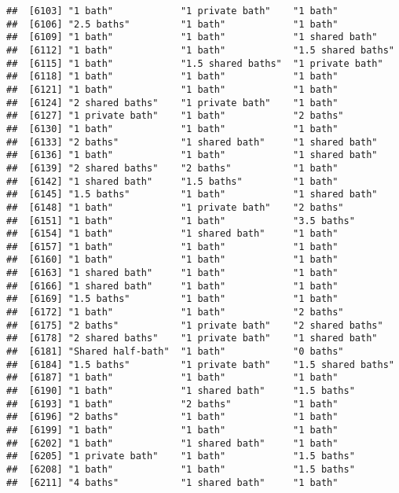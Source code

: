 \documentclass[
]{article}
\begin{document}
\begin{verbatim}
##  [6103] "1 bath"            "1 private bath"    "1 bath"           
##  [6106] "2.5 baths"         "1 bath"            "1 bath"           
##  [6109] "1 bath"            "1 bath"            "1 shared bath"    
##  [6112] "1 bath"            "1 bath"            "1.5 shared baths" 
##  [6115] "1 bath"            "1.5 shared baths"  "1 private bath"   
##  [6118] "1 bath"            "1 bath"            "1 bath"           
##  [6121] "1 bath"            "1 bath"            "1 bath"           
##  [6124] "2 shared baths"    "1 private bath"    "1 bath"           
##  [6127] "1 private bath"    "1 bath"            "2 baths"          
##  [6130] "1 bath"            "1 bath"            "1 bath"           
##  [6133] "2 baths"           "1 shared bath"     "1 shared bath"    
##  [6136] "1 bath"            "1 bath"            "1 shared bath"    
##  [6139] "2 shared baths"    "2 baths"           "1 bath"           
##  [6142] "1 shared bath"     "1.5 baths"         "1 bath"           
##  [6145] "1.5 baths"         "1 bath"            "1 shared bath"    
##  [6148] "1 bath"            "1 private bath"    "2 baths"          
##  [6151] "1 bath"            "1 bath"            "3.5 baths"        
##  [6154] "1 bath"            "1 shared bath"     "1 bath"           
##  [6157] "1 bath"            "1 bath"            "1 bath"           
##  [6160] "1 bath"            "1 bath"            "1 bath"           
##  [6163] "1 shared bath"     "1 bath"            "1 bath"           
##  [6166] "1 shared bath"     "1 bath"            "1 bath"           
##  [6169] "1.5 baths"         "1 bath"            "1 bath"           
##  [6172] "1 bath"            "1 bath"            "2 baths"          
##  [6175] "2 baths"           "1 private bath"    "2 shared baths"   
##  [6178] "2 shared baths"    "1 private bath"    "1 shared bath"    
##  [6181] "Shared half-bath"  "1 bath"            "0 baths"          
##  [6184] "1.5 baths"         "1 private bath"    "1.5 shared baths" 
##  [6187] "1 bath"            "1 bath"            "1 bath"           
##  [6190] "1 bath"            "1 shared bath"     "1.5 baths"        
##  [6193] "1 bath"            "2 baths"           "1 bath"           
##  [6196] "2 baths"           "1 bath"            "1 bath"           
##  [6199] "1 bath"            "1 bath"            "1 bath"           
##  [6202] "1 bath"            "1 shared bath"     "1 bath"           
##  [6205] "1 private bath"    "1 bath"            "1.5 baths"        
##  [6208] "1 bath"            "1 bath"            "1.5 baths"        
##  [6211] "4 baths"           "1 shared bath"     "1 bath"           

\end{verbatim}
\end{document}
